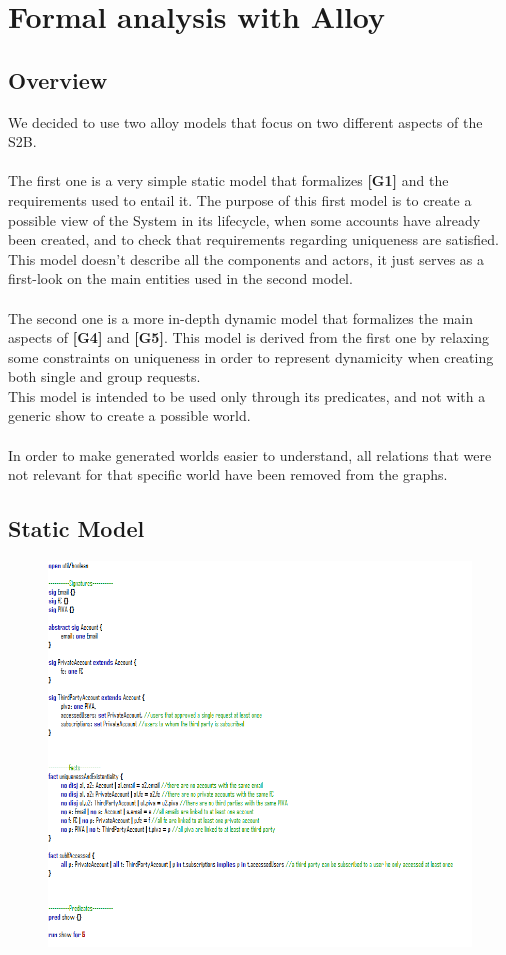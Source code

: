 \documentclass[titlepage]{article}
\begin{document}
	\section{Formal analysis with Alloy}
		
		\subsection{Overview}
		We decided to use two alloy models that focus on two different aspects of the S2B.\\
		\\
		The first one is a very simple static model that formalizes {\bf [G1]} and the requirements used to entail it. The 			purpose of this first model is to create a possible view of the System in its lifecycle, when some accounts have 			already been created, and to check that requirements regarding uniqueness are satisfied. \\
		This model doesn’t describe all the components and actors, it just serves as a first-look on the main entities used in 		the second model.\\
		\\
		The second one is a more in-depth dynamic model that formalizes the main aspects of {\bf [G4]} and {\bf [G5]}. This 		model is derived from the first one by relaxing some constraints on uniqueness in order to represent dynamicity 		when creating both single and group requests.\\
		This model is intended to be used only through its predicates, and not with a generic show to create a possible 		world.\\
		\\
		In order to make generated worlds easier to understand, all relations that were not relevant for that specific world 		have been removed from the graphs.\\
		
		\subsection{Static Model}
		\begin{figure}[H]
			\center
  			\includegraphics[width=0.7\columnwidth]{Alloy/staticAlloy.png}
			\label{fig:staticAlloy}
		\end{figure}
\end{document}
